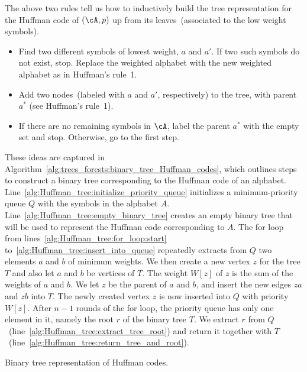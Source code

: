 The above two rules tell us how to inductively build the tree
representation for the Huffman code of $(\cA, p)$ up from its
leaves~(associated to the low weight symbols).
\begin{itemize}
\item Find two different symbols of lowest weight, $a$ and $a'$. If
  two such symbols do not exist, stop. Replace the weighted alphabet
  with the new weighted alphabet as in Huffman's rule~1.

\item Add two nodes~(labeled with $a$ and $a'$, respectively) to the
  tree, with parent $a^*$ (see Huffman's rule~1).

\item If there are no remaining symbols in $\cA$, label the parent
  $a^*$ with the empty set and stop. Otherwise, go to the first step.
\end{itemize}

These ideas are captured in
Algorithm~\ref{alg:trees_forests:binary_tree_Huffman_codes}, which
outlines steps to construct a binary tree corresponding to the Huffman
code of an alphabet.
Line~\ref{alg:Huffman_tree:initialize_priority_queue} initializes a
minimum-priority queue $Q$ with the
symbols in the alphabet
$A$. Line~\ref{alg:Huffman_tree:empty_binary_tree} creates an empty
binary tree that will be used to represent the Huffman code
corresponding to $A$. The for loop from
lines~\ref{alg:Huffman_tree:for_loop:start}
to~\ref{alg:Huffman_tree:insert_into_queue} repeatedly extracts from
$Q$ two elements $a$ and $b$ of minimum weights. We then create a new
vertex $z$ for the tree $T$ and also let $a$ and $b$ be vertices of
$T$. The weight $W[z]$ of $z$ is the sum of the weights of $a$ and
$b$. We let $z$ be the parent of $a$ and $b$, and insert the new edges
$za$ and $zb$ into $T$. The newly created vertex $z$ is now inserted
into $Q$ with priority $W[z]$. After $n - 1$ rounds of the for loop,
the priority queue has only one element in it, namely the root $r$ of
the binary tree $T$. We extract $r$ from
$Q$~(line~\ref{alg:Huffman_tree:extract_tree_root}) and return it
together with $T$~(line~\ref{alg:Huffman_tree:return_tree_and_root}).

\begin{algorithm}[!htbp]

\caption{Binary tree representation of Huffman codes.}
\label{alg:trees_forests:binary_tree_Huffman_codes}
\end{algorithm}


